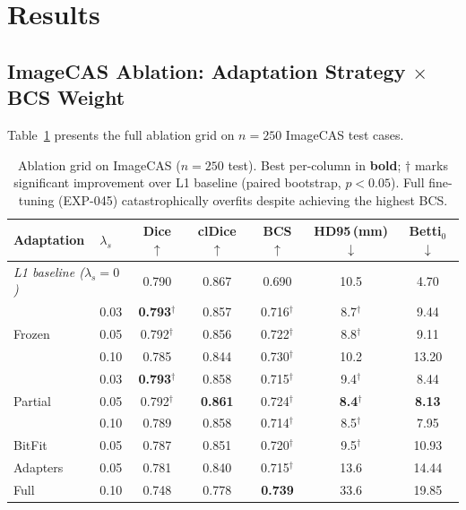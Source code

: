 \documentclass[runningheads]{llncs}
\begin{document}
\section{Results}

\subsection{ImageCAS Ablation: Adaptation Strategy $\times$ BCS Weight}

Table~\ref{tab:ablation} presents the full ablation grid on $n{=}250$ ImageCAS test cases.

\begin{table}[t]
\caption{Ablation grid on ImageCAS ($n{=}250$ test). Best per-column in \textbf{bold}; $\dagger$ marks significant improvement over L1 baseline (paired bootstrap, $p{<}0.05$). Full fine-tuning (EXP-045) catastrophically overfits despite achieving the highest BCS.}
\label{tab:ablation}
\centering
\small
\begin{tabular}{llccccc}
\toprule
Adaptation & $\lambda_s$ & Dice $\uparrow$ & clDice $\uparrow$ & BCS $\uparrow$ & HD95\,(mm) $\downarrow$ & Betti$_0$ $\downarrow$ \\
\midrule
\multicolumn{2}{l}{\textit{L1 baseline ($\lambda_s{=}0$)}} & 0.790 & 0.867 & 0.690 & 10.5 & 4.70 \\
\midrule
\multirow{3}{*}{Frozen}
 & 0.03 & \textbf{0.793}$^\dagger$ & 0.857 & 0.716$^\dagger$ & 8.7$^\dagger$ & 9.44 \\
 & 0.05 & 0.792$^\dagger$ & 0.856 & 0.722$^\dagger$ & 8.8$^\dagger$ & 9.11 \\
 & 0.10 & 0.785 & 0.844 & 0.730$^\dagger$ & 10.2 & 13.20 \\
\midrule
\multirow{3}{*}{Partial}
 & 0.03 & \textbf{0.793}$^\dagger$ & 0.858 & 0.715$^\dagger$ & 9.4$^\dagger$ & 8.44 \\
 & 0.05 & 0.792$^\dagger$ & \textbf{0.861} & 0.724$^\dagger$ & \textbf{8.4}$^\dagger$ & \textbf{8.13} \\
 & 0.10 & 0.789 & 0.858 & 0.714$^\dagger$ & 8.5$^\dagger$ & 7.95 \\
\midrule
BitFit & 0.05 & 0.787 & 0.851 & 0.720$^\dagger$ & 9.5$^\dagger$ & 10.93 \\
Adapters & 0.05 & 0.781 & 0.840 & 0.715$^\dagger$ & 13.6 & 14.44 \\
\midrule
Full & 0.10 & 0.748 & 0.778 & \textbf{0.739} & 33.6 & 19.85 \\
\bottomrule
\end{tabular}
\end{table}
\end{document}
